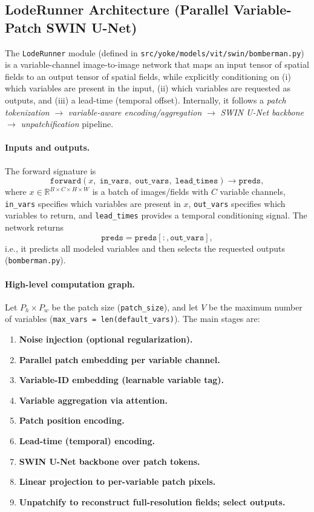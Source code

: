\documentclass{article} %
\begin{document}
\subsection{LodeRunner Architecture (Parallel Variable-Patch SWIN U-Net)}
\label{subsec:loderunner}

The \texttt{LodeRunner} module (defined in \texttt{src/yoke/models/vit/swin/bomberman.py}) is a variable-channel image-to-image network that maps an input tensor of spatial fields to an output tensor of spatial fields, while explicitly conditioning on (i) which variables are present in the input, (ii) which variables are requested as outputs, and (iii) a lead-time (temporal offset). Internally, it follows a \emph{patch tokenization} $\rightarrow$ \emph{variable-aware encoding/aggregation} $\rightarrow$ \emph{SWIN U-Net backbone} $\rightarrow$ \emph{unpatchification} pipeline.

\paragraph{Inputs and outputs.}
The forward signature is
\[
\texttt{forward}(x,\; \texttt{in\_vars},\; \texttt{out\_vars},\; \texttt{lead\_times}) \rightarrow \texttt{preds},
\]
where $x \in \mathbb{R}^{B \times C \times H \times W}$ is a batch of images/fields with $C$ variable channels, \texttt{in\_vars} specifies which variables are present in $x$, \texttt{out\_vars} specifies which variables to return, and \texttt{lead\_times} provides a temporal conditioning signal. The network returns
\[
\texttt{preds} = \texttt{preds}[:, \texttt{out\_vars}],
\]
i.e., it predicts all modeled variables and then selects the requested outputs (\texttt{bomberman.py}).

\paragraph{High-level computation graph.}
Let $P_h \times P_w$ be the patch size (\texttt{patch\_size}), and let $V$ be the maximum number of variables (\texttt{max\_vars = len(default\_vars)}). The main stages are:
\begin{enumerate}
    \item \textbf{Noise injection (optional regularization).}
    \item \textbf{Parallel patch embedding per variable channel.}
    \item \textbf{Variable-ID embedding (learnable variable tag).}
    \item \textbf{Variable aggregation via attention.}
    \item \textbf{Patch position encoding.}
    \item \textbf{Lead-time (temporal) encoding.}
    \item \textbf{SWIN U-Net backbone over patch tokens.}
    \item \textbf{Linear projection to per-variable patch pixels.}
    \item \textbf{Unpatchify to reconstruct full-resolution fields; select outputs.}
\end{enumerate}
\end{document}
